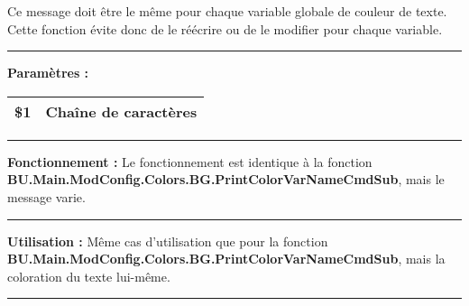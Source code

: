 \documentclass[a4paper,10pt]{article}
\begin{document}
    \begin{justify}
        Ce message doit être le même pour chaque variable globale de couleur de texte. Cette fonction évite donc de le réécrire ou de le modifier pour chaque variable.
    \end{justify}


    \par\noindent\rule{\textwidth}{0.4pt}

    \begin{justify}
        \textbf{Paramètres :}

        \begin{tabular}{|l|l|}
            \hline
            \textbf{\color{vars}\$1} & Chaîne de caractères\\
            \hline
        \end{tabular}
    \end{justify}


    \par\noindent\rule{\textwidth}{0.4pt}

    \begin{justify}
        \textbf{Fonctionnement :} Le fonctionnement est identique à la fonction \textbf{\color{func}BU.Main.ModConfig.Colors.BG.PrintColorVarNameCmdSub}, mais le message varie.
    \end{justify}


    \par\noindent\rule{\textwidth}{0.4pt}

    \begin{justify}
        \textbf{Utilisation :} Même cas d'utilisation que pour la fonction \textbf{\color{func}BU.Main.ModConfig.Colors.BG.PrintColorVarNameCmdSub}, mais la coloration du texte lui-même.
    \end{justify}








    \color{sec1}\par\noindent\rule{\textwidth}{0.4pt}\color{text}
\end{document}
